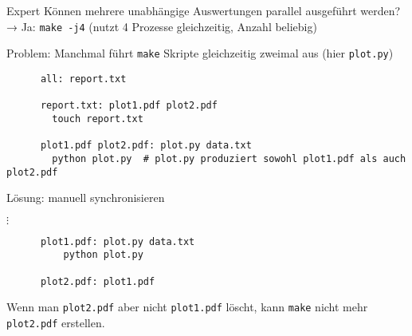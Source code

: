 \begin{frame}[fragile]{Expert}
  Können mehrere unabhängige Auswertungen parallel ausgeführt werden? \\
  → Ja: \;\texttt{make -j4}\; (nutzt 4 Prozesse gleichzeitig, Anzahl beliebig)

  Problem: Manchmal führt \texttt{make} Skripte gleichzeitig zweimal aus (hier \texttt{plot.py})
  \begin{center}
    \begin{verbatim}
      all: report.txt

      report.txt: plot1.pdf plot2.pdf
        touch report.txt

      plot1.pdf plot2.pdf: plot.py data.txt
        python plot.py  # plot.py produziert sowohl plot1.pdf als auch plot2.pdf
    \end{verbatim}
  \end{center}

  Lösung: manuell synchronisieren
  \begin{center}
    $\vdots$ \\
    \begin{verbatim}
      plot1.pdf: plot.py data.txt
          python plot.py

      plot2.pdf: plot1.pdf
    \end{verbatim}
  \end{center}

  Wenn man \texttt{plot2.pdf} aber nicht \texttt{plot1.pdf} löscht, kann \texttt{make} nicht mehr \texttt{plot2.pdf} erstellen.
\end{frame}

